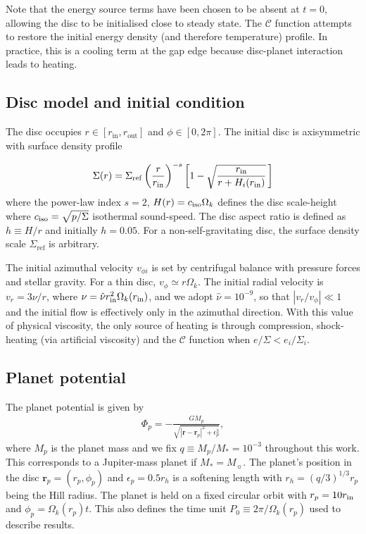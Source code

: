 Note that the energy source terms
have been chosen to be absent at $t=0$, allowing the disc to be
initialised close to steady state. The $\mathcal{C}$ function attempts
to restore the initial energy density (and 
therefore temperature) profile. In practice, this is a cooling term at
the gap edge because disc-planet interaction leads to heating.  

\subsection{Disc model and initial condition}
The disc occupies $r\in[r_\mathrm{in}, r_\mathrm{out}]$ and
$\phi\in[0,2\pi]$. The initial disc is axisymmetric with  
surface density profile  
 
\begin{align}\label{initial_density}
   \Sigma(r) = \Sigma_\mathrm{ref}\left(\frac{r}{r_\mathrm{in}}\right)^{-s}
    \left[1 - \sqrt{\frac{r_\mathrm{in}}{r + H_i(r_\mathrm{in})}}\,\right] 
\end{align}
where the power-law index $s=2$, $H(r) = c_\mathrm{iso}\Omega_k $ defines the disc scale-height 
where $c_\mathrm{iso}=\sqrt{p/\Sigma}$ isothermal sound-speed. The disc aspect ratio is defined as $h\equiv H/r$ and initially
$h=0.05$. For a non-self-gravitating disc, the surface density scale
$\Sigma_\mathrm{ref}$ is arbitrary. 

The initial azimuthal velocity $v_{\phi i}$ is set by centrifugal balance with
pressure forces and stellar gravity. For a thin disc, 
$v_{\phi}\simeq r\Omega_k$. The initial radial velocity is
$v_{r}=3\nu/r$, where $\nu = \hat{\nu}r_\mathrm{in}^2\Omega_k(r_\mathrm{in})$, and we
adopt $\hat{\nu}= 10^{-9}$, so that $|v_{r}/v_{\phi}|\ll1$ and the initial 
flow is effectively only in the azimuthal direction.  With this value 
of physical viscosity, the only source of heating is through
compression, shock-heating (via artificial viscosity) and the
$\mathcal{C}$ function when $e/\Sigma<e_i/\Sigma_i$. 

\subsection{Planet potential}\label{planet_config}
The planet potential is given by 
\begin{align}
  \Phi_p = -\frac{GM_p}{\sqrt{|\bm{r} - \bm{r}_p|^2 + \epsilon_p^2}},
\end{align}
where $M_p$ is the planet mass and we fix $q\equiv M_p/M_*=10^{-3}$
throughout this work. This corresponds to a Jupiter-mass planet if $M_*=M_{\sun}$. 
The planet's position in the disc 
$\bm{r}_p=(r_p,\phi_p)$  and $\epsilon_p=0.5r_h$ is a softening
length with $r_h=(q/3)^{1/3}r_p$ being the Hill radius.  
The planet is held on a fixed circular orbit with $ r_p = 10r_\mathrm{in}$ and $\phi_p=\Omega_k(r_p)t$. 
This also
defines the time unit $P_0\equiv 2\pi/\Omega_k(r_p)$ used to describe results. 


